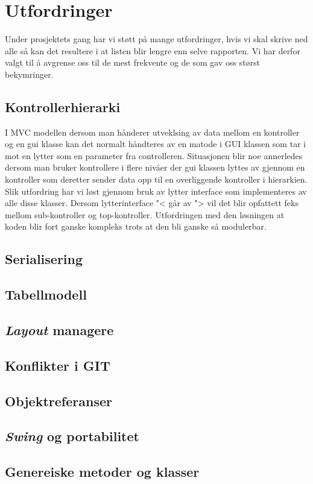 \section{Utfordringer}
Under prosjektets gang har vi støtt på mange utfordringer, hvis vi skal skrive ned alle så kan det resultere i at listen blir lengre enn selve rapporten. Vi har derfor valgt til å avgrense oss til de mest frekvente og de som gav oss størst bekymringer. 

\subsection{Kontrollerhierarki}
I MVC modellen dersom man hånderer utveklsing av data mellom en kontroller og en gui klasse kan det normalt håndteres av en matode i GUI klassen som tar i mot en lytter som en parameter fra controlleren. Situasjonen blir noe annerledes dersom man bruker kontrollere i flere nivåer der gui klassen lyttes av gjennom en kontroller som deretter sender data opp til en overliggende kontroller i hierarkien. Slik utfordring har vi løst gjennom bruk av lytter interface som implementeres av alle disse klasser. Dersom lytterinterface "< går av "> vil det blir opfattett feks mellom sub-kontroller og top-kontroller. Utfordringen med den løsningen at koden blir fort ganske kompleks trots at den bli ganske så modulerbar.
\subsection{Serialisering}
\subsection{Tabellmodell}
\subsection{\emph{Layout} managere}
\subsection{Konflikter i GIT}
\subsection{Objektreferanser}
\subsection{\emph{Swing} og portabilitet}
\subsection{Genereiske metoder og klasser}